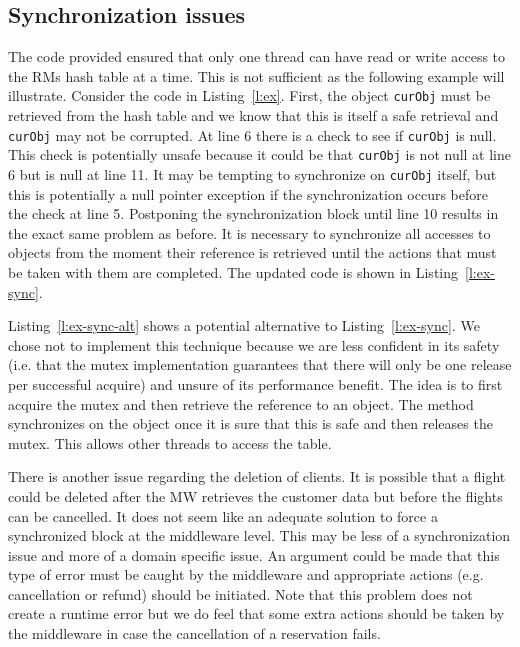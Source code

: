 \documentclass{article}
\begin{document}
\subsection{Synchronization issues}

The code provided ensured that only one thread can have read or write access to the RMs hash table at a time. 
This is not sufficient as the following example will illustrate. 
Consider the code in Listing~\ref{l:ex}. 
First, the object \texttt{curObj} must be retrieved from the hash table and we know that this is itself a safe retrieval and \texttt{curObj} may not be corrupted. 
At line 6 there is a check to see if \texttt{curObj} is null. 
This check is potentially unsafe because it could be that \texttt{curObj} is not null at line 6 but is null at line 11. 
It may be tempting to synchronize on \texttt{curObj} itself, but this is potentially a null pointer exception if the synchronization occurs before the check at line 5. 
Postponing the synchronization block until line 10 results in the exact same problem as before. 
It is necessary to synchronize all accesses to objects from the moment their reference is retrieved until the actions that must be taken with them are completed. 
The updated code is shown in Listing~\ref{l:ex-sync}.

Listing~\ref{l:ex-sync-alt} shows a potential alternative to Listing~\ref{l:ex-sync}. We chose not to implement this technique because we are less confident in its safety (i.e. that the mutex implementation guarantees that there will only be one release per successful acquire) and unsure of its performance benefit. The idea is to first acquire the mutex and then retrieve the reference to an object. The method synchronizes on the object once it is sure that this is safe and then releases the mutex. This allows other threads to access the table. 

There is another issue regarding the deletion of clients. It is possible that a flight could be deleted after the MW retrieves the customer data but before the flights can be cancelled. It does not seem like an adequate solution to force a synchronized block at the middleware level. This may be less of a synchronization issue and more of a domain specific issue. An argument could be made that this type of error must be caught by the middleware and appropriate actions (e.g. cancellation or refund) should be initiated. Note that this problem does not create a runtime error but we do feel that some extra actions should be taken by the middleware in case the cancellation of a reservation fails.
\end{document}
